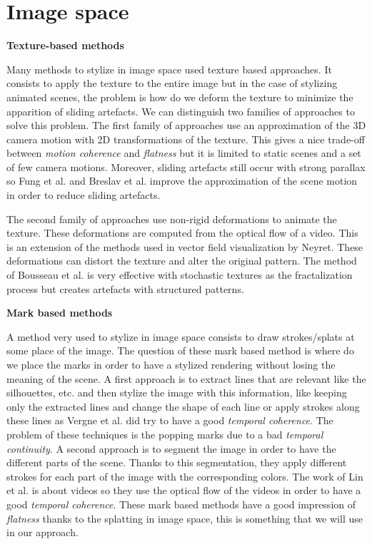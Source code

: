 \section{Image space}

\textbf{Texture-based methods}

Many methods to stylize in image space used texture based approaches. It consists to apply the texture to the entire image \cite{benard_state---art_2011} but in the case of stylizing animated scenes, the problem is how do we deform the texture to minimize the apparition of sliding artefacts. We can distinguish two families of approaches to solve this problem. The first family of approaches use an approximation of the 3D camera motion with 2D transformations of the texture\cite{cunzi_dynamic_nodate}. This gives a nice trade-off between \textit{motion coherence} and \textit{flatness} but it is limited to static scenes and a set of few camera motions. Moreover, sliding artefacts still occur with strong parallax so Fung et al.\cite{fung_pen-and-ink_nodate} and Breslav et al.\cite{breslav_dynamic_nodate} improve the approximation of the scene motion in order to reduce sliding artefacts.

The second family of approaches use non-rigid deformations to animate the texture\cite{bousseau_video_2007}. These deformations are computed from the optical flow of a video. This is an extension of the methods used in vector field visualization by Neyret\cite{neyret_imagis-gravir_nodate}. These deformations can distort the texture and alter the original pattern. The method of Bousseau et al.\cite{bousseau_video_2007} is very effective with stochastic textures as the fractalization process but creates artefacts with structured patterns.



\textbf{Mark based methods}

A method very used to stylize in image space consists to draw strokes/splats at some place of the image\cite{bleron_motion-coherent_2018, vergne_implicit_2011, benard_active_nodate, zeng_image_2009, grabli_programmable_2010}. The question of these mark based method is where do we place the marks in order to have a stylized rendering without losing the meaning of the scene. A first approach is to extract lines that are relevant like the silhouettes, etc. \cite{vergne_implicit_2011, grabli_programmable_2010, lee_line_nodate} and then stylize the image with this information, like keeping only the extracted lines and change the shape of each line or apply strokes along these lines as Vergne et al.\cite{vergne_implicit_2011} did try to have a good \textit{temporal coherence}. The problem of these techniques is the popping marks due to a bad \textit{temporal continuity}.
A second approach is to segment the image in order to have the different parts of the scene\cite{zeng_image_2009, lin_video_nodate}. Thanks to this segmentation, they apply different strokes for each part of the image with the corresponding colors. The work of Lin et al.\cite{lin_video_nodate} is about videos so they use the optical flow of the videos in order to have a good \textit{temporal coherence}. These mark based methods have a good impression of \textit{flatness} thanks to the splatting in image space, this is something that we will use in our approach.
